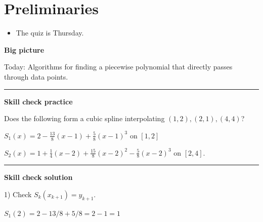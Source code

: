 \documentclass[12pt,letterpaper,noanswers]{exam}
\begin{document}
 \pdfpageheight 11in 
  \pdfpagewidth 8.5in

\noindent 

\section*{Preliminaries}

\begin{itemize}
\itemsep0pt
\item The quiz is Thursday.
\end{itemize}



\noindent\textbf{Big picture}

Today: Algorithms for finding a piecewise polynomial that directly passes through data points.

\vspace{0.2cm}
\hrule
\vspace{0.2cm}

\noindent \textbf{Skill check practice}

Does the following form a cubic spline interpolating $(1,2), (2,1), (4,4)$?

$S_1(x) = 2- \frac{13}{8}(x-1) + \frac{5}{8}(x-1)^3$ on $[1,2]$

$S_2(x) = 1 + \frac{1}{4}(x-2) + \frac{15}{8}(x-2)^2 - \frac{5}{8}(x-2)^3$ on $[2,4]$.









\vspace{0.2cm}
\hrule
\vspace{0.2cm}

\noindent \textbf{Skill check solution}

1) Check $S_k(x_{k+1}) = y_{k+1}$.  

$S_1(2) = 2 - 13/8 + 5/8 = 2 - 1 = 1$
\end{document}
